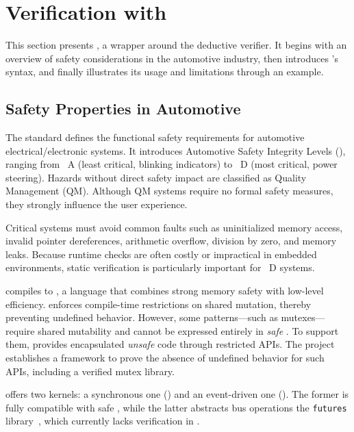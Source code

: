 \section{Verification with \GReusot}
\label{sec:grust:greusot}

This section presents \GReusot, a \GRust wrapper around the \Creusot deductive verifier. It begins
with an overview of safety considerations in the automotive industry, then introduces \GReusot's
syntax, and finally illustrates its usage and limitations through an example.

\subsection{Safety Properties in Automotive}
\label{sec:grust:greusot:auto}

The \iso standard defines the functional safety requirements for automotive electrical/electronic
systems. It introduces Automotive Safety Integrity Levels (\Asil), ranging from \Asil~A (least
critical, \eg blinking indicators) to \Asil~D (most critical, \eg power steering). Hazards without
direct safety impact are classified as Quality Management (QM). Although QM systems require no
formal safety measures, they strongly influence the user experience.

Critical systems must avoid common faults such as uninitialized memory access, invalid pointer
dereferences, arithmetic overflow, division by zero, and memory leaks. Because runtime checks are
often costly or impractical in embedded environments, static verification is particularly important
for \Asil~D systems.

\GRust compiles to \Rust, a language that combines strong memory safety with low-level efficiency.
\Rust enforces compile-time restrictions on shared mutation, thereby preventing undefined behavior.
However, some patterns---such as mutexes---require shared mutability and cannot be expressed
entirely in \emph{safe} \Rust. To support them, \Rust provides encapsulated \emph{unsafe} code
through restricted APIs. The \RustBelt project~\cite{DBLP:journals/pacmpl/0002JKD18}
establishes a framework to prove the absence of undefined behavior for such APIs, including a
verified mutex library.

\GRust offers two kernels: a synchronous one (\GRSync) and an event-driven one (\GRFRP). The former
is fully compatible with safe \Rust, while the latter abstracts bus operations \via the
\texttt{futures} library~\cite{futures}, which currently lacks verification in \RustBelt.

